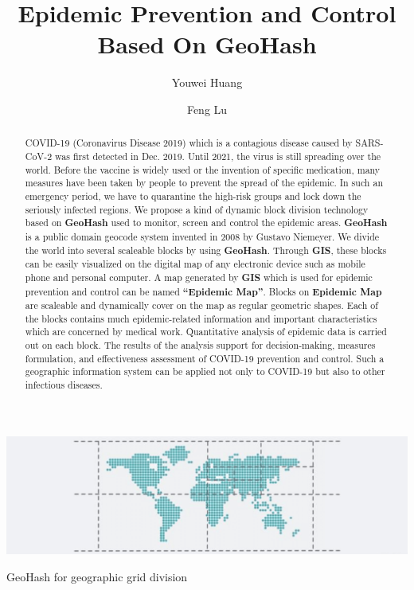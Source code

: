 \documentclass[sigplan,screen]{acmart}
\begin{document}
\title{Epidemic Prevention and Control Based On GeoHash}

\author{Youwei Huang}

\author{Feng Lu}

\begin{teaserfigure}
	\centering\includegraphics[width=\linewidth]{logo.png}
	\caption{GeoHash for geographic grid division}
\end{teaserfigure}

\begin{abstract}
	COVID-19 (Coronavirus Disease 2019) which is a contagious disease caused by SARS-CoV-2\cite{hu2020characteristics} was first detected in Dec. 2019.
	Until 2021, the virus is still spreading over the world.
	Before the vaccine is widely used or the invention of specific medication, many measures have been taken by people to prevent the spread of the epidemic.
	In such an emergency period, we have to quarantine the high-risk groups and lock down the seriously infected regions.
	We propose a kind of dynamic block division technology based on \textbf{GeoHash} used to monitor, screen and control the epidemic areas.
	\textbf{GeoHash} is a public domain geocode system invented in 2008 by Gustavo Niemeyer\cite{niemeyer2008geohash}.
	We divide the world into several scaleable blocks by using \textbf{GeoHash}.
	Through \textbf{GIS}, these blocks can be easily visualized on the digital map of any electronic device such as mobile phone and personal computer.
	A map generated by \textbf{GIS} which is used for epidemic prevention and control can be named \textbf{``Epidemic Map''}.
	Blocks on \textbf{Epidemic Map }are scaleable and dynamically cover on the map as regular geometric shapes.
	Each of the blocks contains much epidemic-related information and important characteristics which are concerned by medical work.
	Quantitative analysis of epidemic data is carried out on each block.
	The results of the analysis support for decision-making, measures formulation, and effectiveness assessment of COVID-19 prevention and control.
	Such a geographic information system can be applied not only to COVID-19 but also to other infectious diseases.
\end{abstract}
\end{document}
